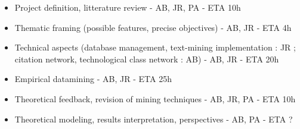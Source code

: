 \begin{itemize}
\item Project definition, litterature review - AB, JR, PA - ETA 10h
\item Thematic framing (possible features, precise objectives) - AB, JR - ETA 4h
\item Technical aspects (database management, text-mining implementation : JR ; citation network, technological class network : AB) - AB, JR - ETA 20h
\item Empirical datamining - AB, JR - ETA 25h
\item Theoretical feedback, revision of mining techniques - AB, JR, PA - ETA 10h
\item Theoretical modeling, results interpretation, perspectives - AB, PA - ETA ?
\end{itemize}





















